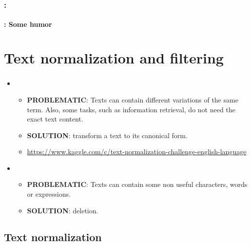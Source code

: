 \documentclass[xcolor=table]{beamer}
\begin{document}
\begin{frame}
	\frametitle{\insertshortsubtitle: \insertsection}
	\framesubtitle{\insertsubsection: Some humor}

	\begin{center}
	\end{center}

\end{frame}


\section{Text normalization and filtering}

\begin{frame}
	\frametitle{\insertshortsubtitle}
	\framesubtitle{\insertsection}

	\begin{itemize}
		\item {}
		\begin{itemize}
			\item \textbf{PROBLEMATIC}: Texts can contain different variations of the same term. 
			Also, some tasks, such as information retrieval, do not need the exact text content.
			\item \textbf{SOLUTION}: transform a text to its canonical form.
			\item \url{https://www.kaggle.com/c/text-normalization-challenge-english-language}
		\end{itemize}
		\item {}
		\begin{itemize}
			\item \textbf{PROBLEMATIC}: Texts can contain some non useful characters, words or expressions.
			\item \textbf{SOLUTION}: deletion.
		\end{itemize}
	\end{itemize}

\end{frame}

\subsection{Text normalization}
\end{document}
